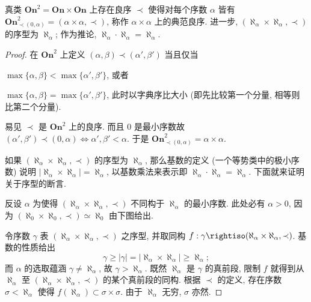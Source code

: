 \begin{theorem}\label{prop:Ord2-canonical}
	真类 $\textbf{On}^2 = \textbf{On} \times \textbf{On}$ 上存在良序 $\prec$ 使得对每个序数 $\alpha$ 皆有 $\textbf{On}^2_{\prec (0, \alpha)} = (\alpha \times \alpha, \prec)$, 称作 $\alpha \times \alpha$ 上的典范良序. 进一步, $(\aleph_\alpha \times \aleph_\alpha, \prec)$ 的序型为 $\aleph_\alpha$; 作为推论, $\aleph_\alpha \cdot \aleph_\alpha = \aleph_\alpha$.
\end{theorem}
\begin{proof}
	在 $\textbf{On}^2$ 上定义 $(\alpha, \beta) \prec (\alpha', \beta')$ 当且仅当
	\begin{compactitem}
		\item $\max\{\alpha, \beta\} < \max\{\alpha', \beta'\}$, 或者
		\item $\max\{\alpha, \beta\} = \max\{\alpha', \beta'\}$, 此时以字典序比大小 (即先比较第一个分量, 相等则比第二个分量).
	\end{compactitem}
	易见 $\prec$ 是 $\textbf{On}^2$ 上的良序. 而且 $0$ 是最小序数故 $(\alpha', \beta') \prec (0, \alpha) \iff \alpha', \beta' < \alpha$. 于是 $\textbf{On}^2_{\prec (0, \alpha)} = \alpha \times \alpha$.
	
	如果 $(\aleph_\alpha \times \aleph_\alpha, \prec)$ 的序型为 $\aleph_\alpha$, 那么基数的定义 (一个等势类中的极小序数) 说明 $|\aleph_\alpha \times \aleph_\alpha| = \aleph_\alpha$, 以基数乘法来表示即 $\aleph_\alpha \cdot \aleph_\alpha = \aleph_\alpha$. 下面就来证明关于序型的断言.

	反设 $\alpha$ 为使得 $(\aleph_\alpha \times \aleph_\alpha, \prec)$ 不同构于 $\aleph_\alpha$ 的最小序数. 此处必有 $\alpha > 0$, 因为 $(\aleph_0 \times \aleph_0, \prec) \simeq \aleph_0$ 由下图给出.
	\begin{center} \qquad {}\end{center}
	令序数 $\gamma$ 表 $(\aleph_\alpha \times \aleph_\alpha, \prec)$ 之序型, 并取同构 $f: \gamma \rightiso (\aleph_\alpha \times \aleph_\alpha, \prec)$. 基数的性质给出
	\[ \gamma \geq |\gamma| = |\aleph_\alpha \times \aleph_\alpha| \geq \aleph_\alpha; \]
	而 $\alpha$ 的选取蕴涵 $\gamma \neq \aleph_\alpha$, 故 $\gamma > \aleph_\alpha$. 既然 $\aleph_\alpha$ 是 $\gamma$ 的真前段, 限制 $f$ 就得到从 $\aleph_\alpha$ 至 $(\aleph_\alpha \times \aleph_\alpha, \prec)$ 的某个真前段的同构. 根据 $\prec$ 的定义, 存在序数 $\sigma < \aleph_\alpha$ 使得 $f(\aleph_\alpha) \subset \sigma \times \sigma$. 由于 $\aleph_\alpha$ 无穷, $\sigma$ 亦然.
	

\end{proof}
